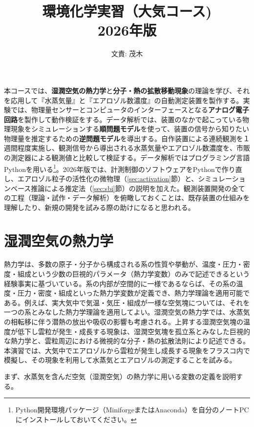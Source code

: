 \documentclass{ltjsarticle}
\begin{document}
\title{環境化学実習（大気コース)\\ 2026年版}

\author{文責: 茂木}

\maketitle
本コースでは、{\bf 湿潤空気の熱力学}と{\bf 分子・熱の拡散移動現象}の理論を学び、それを応用して『水蒸気量』と『エアロゾル数濃度』の自動測定装置を製作する。実験では、物理量センサーとコンピュータのインターフェースとなる{\bf アナログ電子回路}を製作して動作検証をする。データ解析では、装置のなかで起こっている物理現象をシミュレーションする{\bf 順問題モデル}を使って、装置の信号から知りたい物理量を推定するための{\bf 逆問題モデル}を導出する。自作装置による連続観測を１週間程度実施し、観測信号から導出される水蒸気量やエアロゾル数濃度を、市販の測定器による観測値と比較して検証する。データ解析ではプログラミング言語Pythonを用いる\footnote{Python開発環境パッケージ（MiniforgeまたはAnaconda）を自分のノートPCにインストールしておいてください。}。2026年版では、計測制御のソフトウェアをPythonで作り直し、エアロゾル粒子の活性化の微物理（\ref{sec:activation}節）と、シミュレーションベース推論による推定法（\ref{sec:sbi}節）の説明を加えた。観測装置開発の全ての工程（理論・試作・データ解析）を俯瞰しておくことは、既存装置の仕組みを理解したり、新規の開発を試みる際の助けになると思われる。

\tableofcontents


\section{湿潤空気の熱力学}
熱力学は、多数の原子・分子から構成される系の性質や挙動が、温度・圧力・密度・組成という少数の巨視的パラメータ（熱力学変数）のみで記述できるという経験事実に基づいている。系の内部が空間的に一様であるならば、その系の温度・圧力・密度・組成といった熱力学変数が定義でき、熱力学理論を適用可能である。例えば、実大気中で気温・気圧・組成が一様な空気塊については、それを一つの系とみなした熱力学理論を適用してよい。湿潤空気の熱力学では、水蒸気の相転移に伴う潜熱の放出や吸収の影響も考慮される。上昇する湿潤空気塊の温度が低下し雲粒が発生・成長する現象は、湿潤空気塊を孤立系とみなした巨視的な熱力学と、雲粒周辺における微視的な分子・熱の拡散法則により記述できる。本演習では、大気中でエアロゾルから雲粒が発生し成長する現象をフラスコ内で模擬し、その現象を利用して水蒸気とエアロゾルの測定することを試みる。

まず、水蒸気を含んだ空気（湿潤空気）の熱力学に用いる変数の定義を説明する。
\end{document}
